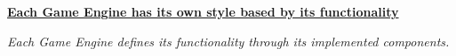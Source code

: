 


\begin{center}
  \underline{\textbf{Each Game Engine has its own style based by its functionality}}

  \emph{Each Game Engine defines its functionality through its implemented components.}
\end{center}










